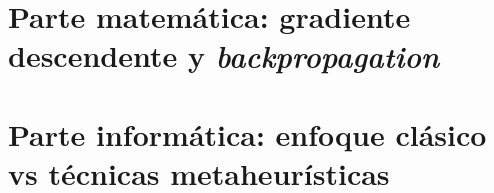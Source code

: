 ﻿\documentclass[a4paper,11pt]{article}
\begin{document}

%
\tableofcontents
\newpage
%
\setcounter{page}{1}
\setcounter{section}{0}
%


\newpage

\part{Parte matemática: gradiente descendente y \textit{backpropagation}}
\vspace{4cm}

\newpage 










\newpage

\part{Parte informática: enfoque clásico vs técnicas metaheurísticas}

\vspace{4cm}

\newpage











\end{document}
